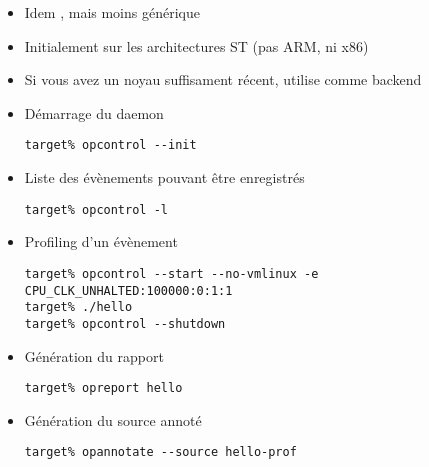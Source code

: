 \begin{frame}[fragile=singleslide]{}
  \begin{itemize} 
  \item Idem , mais moins générique
  \item Initialement sur les architectures ST (pas ARM, ni x86)
  \item  Si  vous avez  un  noyau  suffisament récent,  
    utilise  comme backend
  \item Démarrage du daemon
    \begin{lstlisting} 
target% opcontrol --init
    \end{lstlisting} 
  \item Liste des évènements pouvant être enregistrés
    \begin{lstlisting} 
target% opcontrol -l
    \end{lstlisting} 
  \item Profiling d'un évènement 
    \begin{lstlisting} 
target% opcontrol --start --no-vmlinux -e CPU_CLK_UNHALTED:100000:0:1:1
target% ./hello
target% opcontrol --shutdown
    \end{lstlisting} 
  \end{itemize}
\end{frame}

\begin{frame}[fragile=singleslide]{}
  \begin{itemize} 
  \item Génération du rapport
    \begin{lstlisting} 
target% opreport hello
    \end{lstlisting} 
  \item Génération du source annoté
    \begin{lstlisting} 
target% opannotate --source hello-prof
    \end{lstlisting} 
  \end{itemize} 
\end{frame}


